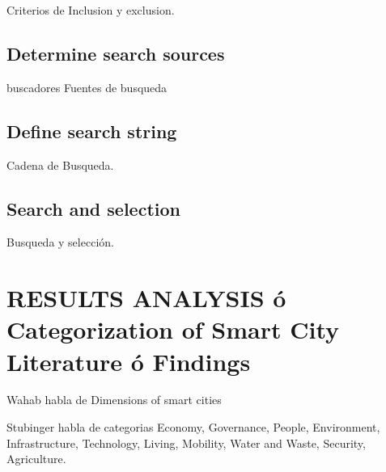 \documentclass[a4paper,fleqn,spanish]{cas-dc}
\begin{document}
Criterios de Inclusion y exclusion.

\subsection{Determine search sources}\label{fuentes}

buscadores
Fuentes de busqueda

\subsection{Define search string}\label{cadena}

Cadena de Busqueda.

\subsection{Search and selection}\label{seleccion}

Busqueda y selección.

\section{RESULTS ANALYSIS ó Categorization of Smart City Literature ó Findings}\label{resultados}

Wahab habla de Dimensions of smart cities \cite{wahab_systematic_2020}

Stubinger habla de categorias \cite{stubinger_understanding_2020}
Economy,
Governance,
People,
Environment,
Infrastructure,
Technology,
Living,
Mobility,
Water and Waste,
Security, 
Agriculture.






\end{document}
